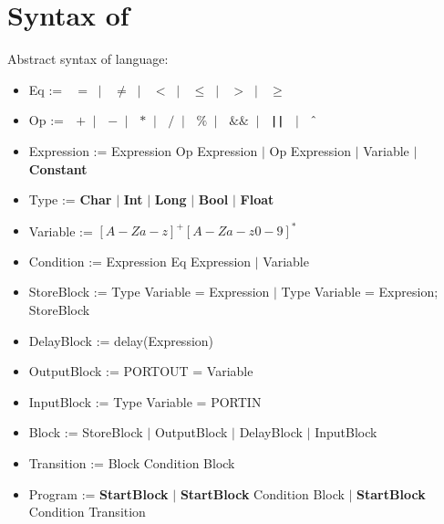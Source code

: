 \section{Syntax of \plcchart}
\label{sec:statechartsyn}

Abstract syntax of \plcchart language:
\begin{definition}
\plcchart

\begin{itemize}
	\item Eq := $\;$ \boldmath$=$\unboldmath $\; \mid \;$ \boldmath$\neq$\unboldmath $\; \mid \;$ \boldmath$<$\unboldmath $\; \mid \;$ \boldmath$\leq$\unboldmath $\; \mid \;$ \boldmath$>$\unboldmath $\; \mid \;$ \boldmath$\geq$\unboldmath	
	\item Op := $\;$ \boldmath$+$\unboldmath $\; \mid \;$ \boldmath$-$\unboldmath $\; \mid \;$ \boldmath$*$\unboldmath $\; \mid \;$ \boldmath$/$\unboldmath $\; \mid \;$ \boldmath$\%$\unboldmath $\; \mid \;$ \boldmath$\&\&$\unboldmath $\; \mid \;$ \textbf{\texttt{||}} $\; \mid \;$ \boldmath$\mathbin{\char`\^}$\unboldmath

	\item Expression := Expression Op Expression $\mid$ Op Expression $\mid$ Variable $\mid$ \textbf{Constant}
	
	\item Type := \textbf{Char} $\mid$ \textbf{Int} $\mid$ \textbf{Long} $\mid$ \textbf{Bool} $\mid$ \textbf{Float}
	\item Variable := $[A-Za-z]^+[A-Za-z0-9]^*$

	\item Condition := Expression Eq Expression $\mid$ Variable

		
	\item StoreBlock := Type Variable = Expression $\mid$ Type Variable = Expresion; StoreBlock
	\item DelayBlock := delay(Expression)
	\item OutputBlock := PORTOUT = Variable
	\item InputBlock := Type Variable = PORTIN
	\item Block := StoreBlock $\mid$ OutputBlock $\mid$ DelayBlock $\mid$ InputBlock

	
	\item Transition := Block Condition Block
	
	\item Program := \textbf{StartBlock} $\mid$ \textbf{StartBlock} Condition Block $\mid$ \textbf{StartBlock} Condition Transition
\end{itemize}
\end{definition}

